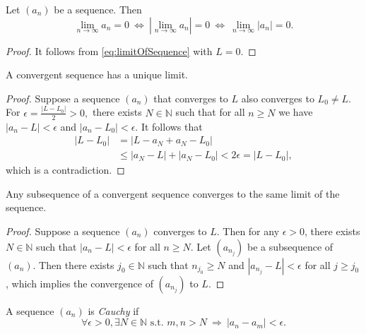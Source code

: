 \begin{lem}
  \label{lem:seqCvTo0IsEqulvalentToAbsoluteSeqCvTo0}
  Let $(a_{n})$ be a sequence. Then
  \begin{displaymath}
    \lim_{n\rightarrow \infty}a_{n}=0\
    \Leftrightarrow\
    \left|\lim_{n\rightarrow \infty}a_{n}\right|=0\
    \Leftrightarrow\
    \lim_{n\rightarrow\infty}|a_{n}|=0.
  \end{displaymath}
\end{lem}
\begin{proof}
  It follows from \eqref{eq:limitOfSequence} with $L=0$.
\end{proof}

\begin{lem}
  \label{lem:seqLimitIsUnique}
  A convergent sequence has a unique limit.
\end{lem}
\begin{proof}
  Suppose a sequence $(a_{n})$ that converges to $L$
  also converges to $L_{0}\neq L.$
  For $\epsilon=\frac{|L-L_{0}|}{2}>0,$ there exists $N\in \mathbb{N}$
  such that for all $n\ge N$ we have
  $|a_{n}-L|<\epsilon$ and $|a_{n}-L_{0}|<\epsilon$. It follows that
  \begin{align*}
    |L-L_{0}|&= |L-a_{N}+a_{N}-L_{0}|\\
    &\le |a_{N}-L|+|a_{N}-L_{0}|
    < 2\epsilon = |L-L_{0}|,
  \end{align*}
  which is a contradiction.
\end{proof}

\begin{lem}
  \label{lem:subsequenceInConvergentSequenceIsConvergent}
  Any subsequence of a convergent sequence converges
  to the same limit of the sequence.
\end{lem}
\begin{proof}
  Suppose a sequence $(a_{n})$ converges to $L$.
  Then for any $\epsilon>0$, there exists $N\in \mathbb{N}$ such that
  $|a_{n}-L|<\epsilon$ for all $n\ge N$.
  Let $(a_{n_{j}})$ be a subsequence of $(a_{n})$.
  Then there exists $j_{0}\in \mathbb{N}$
  such that $n_{j_{0}}\ge N$
  and $|a_{n_{j}}-L|<\epsilon$ for all $j\ge j_{0}$,
  which implies the convergence of $(a_{n_{j}})$ to $L$.
\end{proof}

\begin{defn}
  \label{def:CauchySequence}
  A sequence $(a_n)$ is \emph{Cauchy} if
  \begin{equation}
    \label{eq:CauchySequence}
    \forall \epsilon>0, \exists N\in \mathbb{N}
    \text{ s.t. } m,n>N\ \Rightarrow\ |a_n-a_m| < \epsilon.
  \end{equation}
\end{defn}

